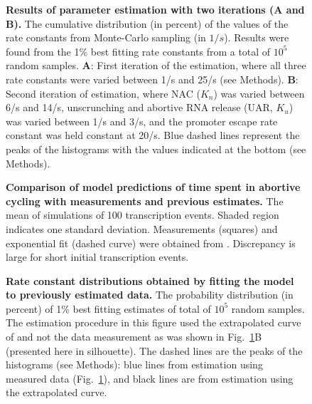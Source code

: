 \documentclass{bmcart}
\newcommand{\FIG}{{Fig.}}
\begin{document}
\begin{backmatter}
\begin{figure}[h!]
\begin{center}
    \end{center}
  \caption{{\bf Results of parameter estimation with two iterations (A and
      B).}
      The cumulative distribution (in percent) of the values of the rate
      constants from Monte-Carlo sampling (in
      $1/s$). Results were found from the 1\% best fitting rate constants
      from a total of $10^5$ random samples. \textbf{A}: First iteration of
      the estimation, where all three rate constants were varied between 1/s
      and 25/s (see Methods). \textbf{B}: Second iteration of estimation,
      where NAC ($K_n$) was varied between 6/s and 14/s, unscrunching and
      abortive RNA release (UAR, $K_u$) was varied between 1/s and 3/s, and
      the promoter escape rate constant was held constant at 20/s. Blue dashed
      lines represent the peaks of the histograms with the values
      indicated at the bottom (see Methods). }
      \label{fig:parameter_estimation_proper}
\end{figure}

\begin{figure}[h!]
    \begin{center}
    \end{center}
  \caption{{\bf Comparison of model predictions of time spent in abortive
  cycling with measurements and previous estimates.}
  The mean of simulations of 100 transcription events. Shaded region indicates
  one standard deviation. Measurements (squares) and exponential fit (dashed
  curve) were obtained from \cite{revyakin_abortive_2006}. Discrepancy is
  large for short initial transcription events.}
  \label{fig:revyakin_fit}
\end{figure}


\begin{figure}[h!]
    \begin{center}
    \end{center}
    \caption{
      {\bf Rate constant distributions obtained by fitting the model to
      previously estimated data.}
      The probability distribution (in percent) of 1\% best fitting estimates
      of total of $10^5$ random samples. The estimation procedure in this
      figure used the extrapolated curve of \cite{revyakin_abortive_2006} and
      not the data measurement as was shown in
      \FIG~\ref{fig:parameter_estimation_proper}B (presented here in
      silhouette). The dashed lines are the peaks of the histograms (see
      Methods): blue lines from estimation using measured data
      (\FIG~\ref{fig:parameter_estimation_proper}), and black
      lines are from estimation using the extrapolated curve.}
\label{fig:extrap_and_GreB_minus_fit}
\end{figure}


\end{backmatter}
\end{document}
